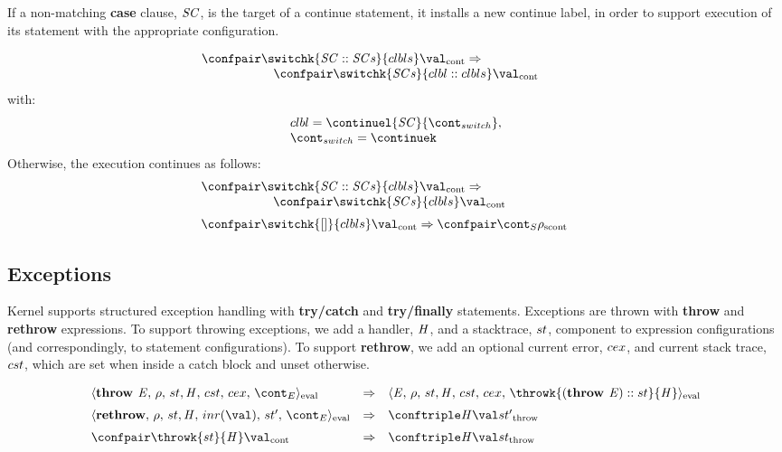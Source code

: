 \documentclass{article}
\begin{document}
\noindent
If a non-matching \textbf{case} clause, $\mathit{SC}$, is the target of a continue statement, it installs a new continue label, in order to support execution of its statement with the appropriate configuration.

\[
  \begin{array}{lcl}
	\contconf{\switchk{\scase :: \scases}{\clbls}}{\val}
	\Rightarrow \hspace{30mm}\\
	\hspace{20mm}\contconf{\switchk{\scases}{\clbl :: \clbls}}{\val}
  \end{array}
\]
with:
\[
  \begin{array}{l}
	\clbl = \continuel{\scase}{\switchcont},\\
	\switchcont = \continuek
  \end{array}
\]
\noindent
Otherwise, the execution continues as follows:
\[
  \begin{array}{lcl}
    \contconf{\switchk{\scase :: \scases}{\clbls}}{\val}
	\Rightarrow \hspace{30mm}\\
	\hspace{20mm}\contconf{\switchk{\scases}{\clbls}}{\val}\\[2mm]

	\contconf{\switchk{[]}{\clbls}}{\val}
	\Rightarrow
	\scontconf{\scont}{\env}
  \end{array}
\]

\subsection{Exceptions}

Kernel supports structured exception handling with \textbf{try/catch} and \textbf{try/finally} statements. Exceptions are thrown with \textbf{throw} and \textbf{rethrow} expressions. To support throwing exceptions, we add a handler, $\mathit{H}$, and a stacktrace, $st$, component to expression configurations (and correspondingly, to statement configurations). To support \textbf{rethrow}, we add an optional current error, $cex$, and current stack trace, $cst$, which are set when inside a catch block and unset otherwise.

\[
  \begin{array}{lcl}
	\evalconf{\textbf{throw } \expr}{\env}{\strace}{\cstrace}{\cex}{\econt}
	& \Rightarrow &
	\evalconf{\expr}{\env}{\strace}{\cstrace}{\cex}{\throwk{(\textbf{throw } \expr) :: \strace}{\handler}}\\[2mm]

	\evalconf{\textbf{rethrow}}{\env}{\strace}{inr(\val)}{\strace'}{\econt}
	& \Rightarrow &
	\throwconf{\handler}{\val}{\strace'}\\[2mm]

	\contconf{\throwk{\strace}{\handler}}{\val}
	& \Rightarrow &
	\throwconf{\handler}{\val}{\strace}\\[2mm]

  \end{array}
\]
\end{document}
